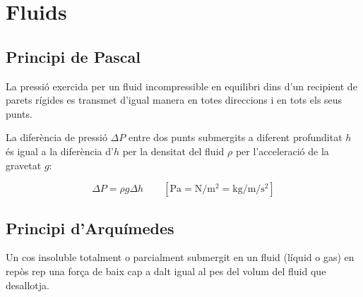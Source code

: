 \section{Fluids}
\label{sec:fluids}

\subsection{Principi de Pascal}
\label{sub:principi_de_pascal}

\begin{displayquote}
    La pressió exercida per un fluid incompressible en equilibri dins d'un
    recipient de parets rígides es transmet d'igual manera en totes direccions i en
    tots els seus punts.
\end{displayquote}

La diferència de pressió $\Delta P$ entre dos punts submergits a diferent
profunditat $h$ és igual a la diferència d'$h$ per la densitat del fluid $\rho$
per l'acceleració de la gravetat $g$:

\begin{equation}
    \Delta P = \rho g \Delta h \qquad \left[ \si{\pascal} = \si{\newton \per \metre \squared} = \si{\kilo \gram \per\metre \per\second\squared} \right]
\end{equation}

\begin{center}
\end{center}

\subsection{Principi d'Arquímedes}
\label{sub:principi_d_arquimedes}

\begin{displayquote}
    Un cos insoluble totalment o parcialment submergit en un fluid (líquid o gas)
    en repòs rep una força de baix cap a dalt igual al pes del volum del fluid que
    desallotja.
\end{displayquote}

